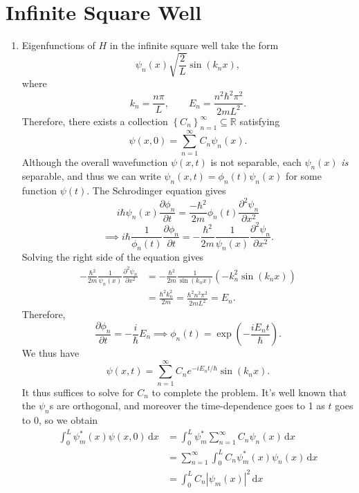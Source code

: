 \documentclass[11pt, letterpaper]{article}
\begin{document}
\section{Infinite Square Well}
\begin{enumerate}
	\item Eigenfunctions of $H$ in the infinite square well take the form
		\[
			\psi _n(x)\sqrt{\frac{2}{L} } \sin \left( k_nx \right) ,
		\]
		where
		\[
			k_n=\frac{n\pi }{L} ,\qquad E_n=\frac{n^2\hbar ^2\pi ^2}{2mL^2} 
		.\]
		Therefore, there exists a collection $\left\{ C_n \right\}_{n=1}^{\infty } \subseteq \mathbb{R} $ satisfying
		\[
			\psi (x,0)=\sum_{n=1}^{\infty} C_n \psi _n(x)
		.\]
		Although the overall wavefunction $\psi (x,t)$ is not separable, each $\psi _n(x)$ \emph{is} separable, and thus we can write $\psi _n(x,t)=\phi_n(t)\psi _n(x)$ for some function $\psi (t)$. The Schrodinger equation gives
		\[
			i\hbar\psi_n(x) \frac{\partial \phi_n }{\partial t} =\frac{-\hbar ^2}{2m}\phi _n(t) \frac{\partial ^2\psi _n}{\partial x^2} 
		\]
		\[
			\implies i\hbar \frac{1}{\phi_n (t)} \frac{\partial \phi _n}{\partial t} =-\frac{\hbar ^2}{2m} \frac{1}{\psi _n(x)} \frac{\partial ^2\psi _n}{\partial x^2} 
		.\]
		Solving the right side of the equation gives
		\begin{align*}
			-\frac{\hbar ^2}{2m} \frac{1}{\psi _n(x)} \frac{\partial ^2\psi _n}{\partial x^2} &=-\frac{\hbar ^2}{2m} \frac{1}{\sin \left( k_nx \right) } \left(-k_n^2 \sin \left( k_nx \right) \right)\\
													  &=\frac{\hbar ^2k_n^2}{2m} =\frac{\hbar ^2n^2\pi ^2}{2mL^2} =E_n
		.\end{align*}
		Therefore,
		\[
			\frac{\partial \phi _n}{\partial t} =-\frac{i}{\hbar }  E_n\implies \phi _n(t)=\exp \left( -\frac{iE_nt}{\hbar } \right) 
		.\]
		We thus have
		\[
			\psi (x,t)=\sum_{n=1}^{\infty} C_n e^{-i E_nt/\hbar } \sin \left( k_nx \right) 
		.\]
		It thus suffices to solve for $C_n$ to complete the problem. It's well known that the $\psi _n$s are orthogonal, and moreover the time-dependence goes to 1 as $t$ goes to 0, so we obtain
		\begin{align*}
			\int_{0}^{L} \psi_m^*(x)\psi (x,0) \,\mathrm{d} x&=\int_{0}^{L} \psi _m^*\sum_{n=1}^{\infty} C_n\psi _n(x) \,\mathrm{d} x\\
									 &=\sum_{n=1}^{\infty} \int_{0}^{L} C_n \psi_m^*(x)\psi_n(x) \,\mathrm{d} x\\
									 &=\int_{0}^{L} C_n \left| \psi _m(x) \right| ^2 \,\mathrm{d} x\\

\end{align*}
\end{enumerate}
\end{document}
